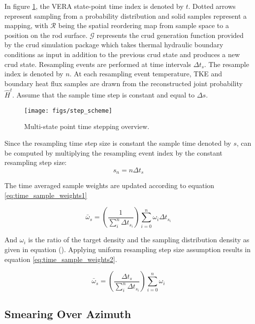 In figure \ref{fig:stepscheme}, the VERA state-point time index is denoted by $t$. Dotted arrows represent sampling from a probability distribution and solid samples represent a mapping, with $\mathcal R$ being the spatial reordering map from sample space to a position on the rod surface. $\mathcal G$ represents the crud generation function provided by the crud simulation package which takes thermal hydraulic boundary conditions as input in addition to the previous crud state and produces a new crud state.  Resampling events are performed at time intervals $\Delta t_s$.  The resample index is denoted by $n$.  At each resampling event temperature, TKE and boundary heat flux samples are drawn from the reconstructed joint probability $\hat H^t$.  Assume that the sample time step is constant and equal to $\Delta s$.

\begin{figure}[H]
    \centering
    \texttt{[image: figs/step\_scheme]}
    \caption{Multi-state point time stepping overview.}
    \label{fig:stepscheme}
\end{figure}

Since the resampling time step size is constant the sample time denoted by $s$, can be computed by multiplying the resampling event index by the constant resampling step size:
\begin{equation}
s_n = n\Delta t_s
\end{equation}

The time averaged sample weights are updated according to equation \ref{eq:time_sample_weights1}

\begin{equation}
\bar \omega_s = \left( \frac{1}{\sum_i^n \Delta t_{s_i}} \right) \sum_{i=0}^n \omega_i \Delta t_{s_i}
\label{eq:time_sample_weights1}
\end{equation}

And $\omega_i$ is the ratio of the target density and the sampling distribution density as given in equation ().  Applying uniform resampling step size assumption results in equation \ref{eq:time_sample_weights2}.

\begin{equation}
\bar \omega_s = \left( \frac{\Delta t_s}{\sum_i^n \Delta t_{s_i}} \right) \sum_{i=0}^n \omega_i
\label{eq:time_sample_weights2}
\end{equation}

\subsection{Smearing Over Azimuth}

